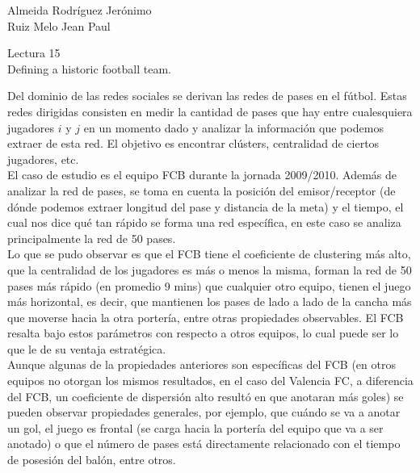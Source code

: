 \documentclass[a4paper, 12pt]{report}
\begin{document}
\begin{flushright}
    Almeida Rodríguez Jerónimo\\
    Ruiz Melo Jean Paul
\end{flushright}

\begin{center}
    {\LARGE Lectura 15}\\
    {\LARGE Defining a historic football team.}
\end{center}

Del dominio de las redes sociales se derivan las redes de pases en el fútbol.
Estas redes dirigidas consisten en medir la cantidad de pases que hay entre
cualesquiera jugadores $i$ y $j$ en un momento dado y analizar la información
que podemos extraer de esta red. El objetivo es encontrar clústers, centralidad
de ciertos jugadores, etc.\\

El caso de estudio es el equipo FCB durante la jornada 2009/2010. Además de
analizar la red de pases, se toma en cuenta la posición del emisor/receptor (de
dónde podemos extraer longitud del pase y distancia de la meta) y el tiempo, el
cual nos dice qué tan rápido se forma una red específica, en este caso se
analiza principalmente la red de 50 pases.\\

Lo que se pudo observar es que el FCB tiene el coeficiente de clustering más
alto, que la centralidad de los jugadores es más o menos la misma, forman la
red de 50 pases más rápido (en promedio 9 mins) que cualquier otro equipo,
tienen el juego más horizontal, es decir, que mantienen los pases de lado a lado
de la cancha más que moverse hacia la otra portería, entre otras propiedades
observables. El FCB resalta bajo estos parámetros con respecto a otros equipos,
lo cual puede ser lo que le de su ventaja estratégica.\\

Aunque algunas de la propiedades anteriores son específicas del FCB (en otros
equipos no otorgan los mismos resultados, en el caso del Valencia FC, a
diferencia del FCB, un coeficiente de dispersión alto resultó en que anotaran
más goles)
se pueden observar propiedades generales, por ejemplo, que cuándo se va a anotar
un gol, el juego es frontal (se carga hacia la portería del equipo que va a ser
anotado) o que el número de pases está directamente relacionado con el tiempo de
posesión del balón, entre otros.\\
\end{document}
